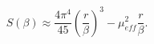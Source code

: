 \begin{equation}
S\left(\beta \right)\approx \frac{4\pi ^{4}}{45}\left(\frac{r}{\beta }\right)^{3}-\mu _{eff}^{2}\frac{r}{\beta }.\end{equation}

